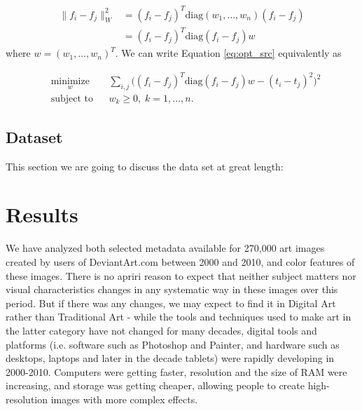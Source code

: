 \documentclass[letterpaper]{article}
\begin{document}
\begin{equation*}
\begin{aligned}
\|f_{i} - f_{j}\|^{2}_{W}  &= (f_{i} - f_{j})^{T}\text{diag}(w_{1}, \ldots, w_{n})(f_{i} - f_{j})\\
& = (f_{i} - f_{j})^{T}\text{diag}(f_{i} - f_{j})w
\end{aligned}
\end{equation*}
where $w = (w_{1}, \ldots, w_{n})^{T}$. We can write Equation \ref{eq:opt_src} equivalently as 

\begin{equation} \label{eq:opt_src} 
\begin{aligned}
& \underset{w}{\text{minimize}} & & \sum_{i,j} \big((f_{i} - f_{j})^{T}\text{diag}(f_{i} - f_{j})w - (t_{i} - t_{j})^{2}\big)^{2}  \\
& \text{subject to} & &  w_{k} \ge 0, \; k = 1, \ldots, n. 
\end{aligned}
\end{equation}

\subsection{Dataset}

This section we are going to discuss the data set at great length:



\section{Results}

We have analyzed both selected metadata available for 270,000 art images created by users of DeviantArt.com between 2000 and 2010, and color features of these images. There is no apriri reason to expect that neither subject matters nor visual characteristics changes in any systematic way in these images over this period. But if there was any changes, we may expect to find it in Digital Art rather than Traditional Art - while the tools and techniques used to make art in the latter category have not changed for many decades, digital tools and platforms (i.e. software such as Photoshop and Painter, and hardware such as desktops, laptops and later in the decade tablets) were rapidly developing in 2000-2010. Computers were getting faster, resolution and the size of RAM were increasing, and storage was getting cheaper, allowing people to create high-resolution images with more complex effects.
\end{document}
